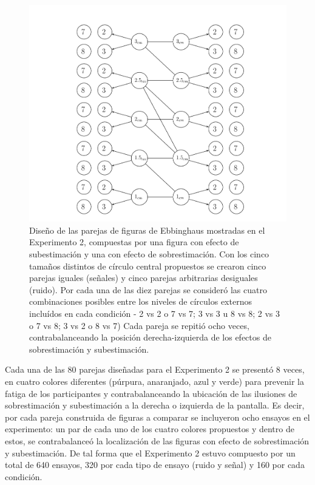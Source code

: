 \begin{itemize}
\begin{figure}[th]
\centering
\includegraphics[width=1.2\textwidth]{Figures/Estimulos_Experimento2} 
\decoRule
\caption[Diseño de Estimulos en el Experimento 2]{Diseño de las parejas de figuras de Ebbinghaus mostradas en el Experimento 2, compuestas por una figura con efecto de subestimación y una con efecto de sobrestimación. Con los cinco tamaños distintos de círculo central propuestos se crearon cinco parejas iguales (señales) y cinco parejas arbitrarias desiguales (ruido). Por cada una de las diez parejas se consideró las cuatro combinaciones posibles entre los niveles de círculos externos incluídos en cada condición - 2 vs 2 o 7 vs 7; 3 vs 3 u 8 vs 8; 2 vs 3 o 7 vs 8; 3 vs 2 o 8 vs 7) Cada pareja se repitió ocho veces, contrabalanceando la posición derecha-izquierda de los efectos de sobrestimación y subestimación.}
\label{fig:Exp_2}
\end{figure}
\end{itemize}

Cada una de las 80 parejas diseñadas para el Experimento 2 se presentó 8 veces, en cuatro colores diferentes (púrpura, anaranjado, azul y verde) para prevenir la fatiga de los participantes y contrabalanceando la ubicación de las ilusiones de sobrestimación y subestimación a la derecha o izquierda de la pantalla. Es decir, por cada pareja construida de figuras a comparar se incluyeron ocho ensayos en el experimento: un par de cada uno de los cuatro colores propuestos y dentro de estos, se contrabalanceó la localización de las figuras con efecto de sobrestimación y subestimación. De tal forma que el Experimento 2 estuvo compuesto por un total de 640 ensayos, 320 por cada tipo de ensayo (ruido y señal) y 160 por cada condición.\\ 

